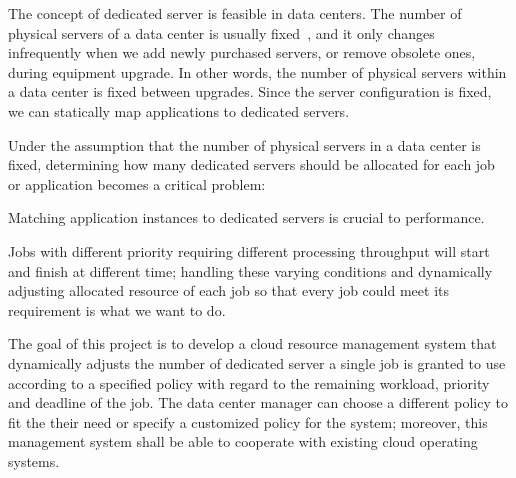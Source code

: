 The concept of dedicated server is feasible in data centers.
The number of physical servers of a data center is usually
fixed~\cite{cite:maintenance_framework}, and it only changes
infrequently when we add newly purchased servers, or remove obsolete
ones, during equipment upgrade.
In other words, the number of physical servers within a data center is
fixed between upgrades.
Since the server configuration is fixed, we can statically map
applications to dedicated servers.

Under the assumption that the number of physical servers in a data
center is fixed, determining how many dedicated servers should be
allocated for each job or application becomes a critical problem:

Matching application instances to dedicated servers is crucial to
performance.



Jobs with different priority requiring different processing throughput
will start and finish at different time; handling these varying
conditions and dynamically adjusting allocated resource of each job so
that every job could meet its requirement is what we want to do.

The goal of this project is to develop a cloud resource management
system that dynamically adjusts the number of dedicated server a single
job is granted to use according to a specified policy with regard to the
remaining workload, priority and deadline of the job.
The data center manager can choose a different policy to fit the their
need or specify a customized policy for the system; moreover, this
management system shall be able to cooperate with existing cloud
operating systems.

